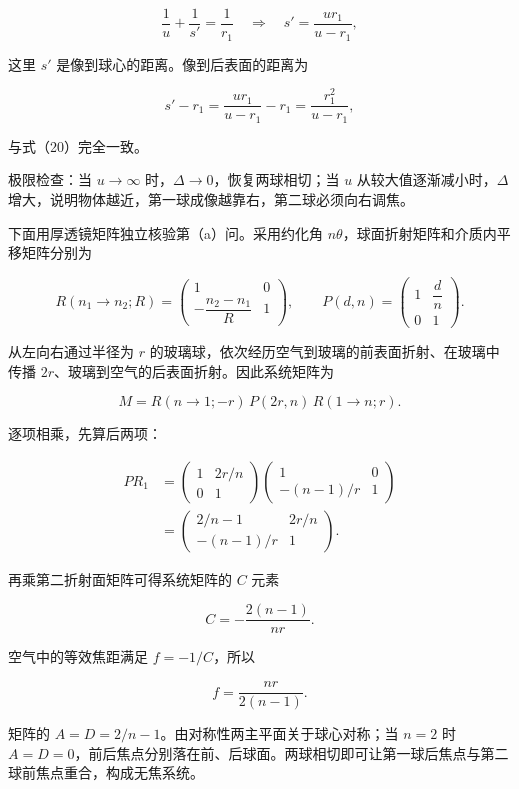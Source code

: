 \documentclass[12pt,a4paper,UTF8]{ctexart}
\begin{document}
\[
\frac1u+\frac1{s'}=\frac1{r_1}
\quad\Longrightarrow\quad
s'=\frac{ur_1}{u-r_1}, \tag{21}
\]

这里 \(s'\) 是像到球心的距离。像到后表面的距离为

\[
s'-r_1
=\frac{ur_1}{u-r_1}-r_1
=\frac{r_1^2}{u-r_1}, \tag{22}
\]

与式（20）完全一致。

极限检查：当 \(u\to\infty\) 时，\(\Delta\to0\)，恢复两球相切；当 \(u\)
从较大值逐渐减小时，\(\Delta\)
增大，说明物体越近，第一球成像越靠右，第二球必须向右调焦。

下面用厚透镜矩阵独立核验第（a）问。采用约化角
\(n\theta\)，球面折射矩阵和介质内平移矩阵分别为

\[
R(n_1\to n_2;R)=
\begin{pmatrix}
1&0\\
-\dfrac{n_2-n_1}{R}&1
\end{pmatrix},
\qquad
P(d,n)=
\begin{pmatrix}
1&\dfrac dn\\
0&1
\end{pmatrix}. \tag{23}
\]

从左向右通过半径为 \(r\)
的玻璃球，依次经历空气到玻璃的前表面折射、在玻璃中传播
\(2r\)、玻璃到空气的后表面折射。因此系统矩阵为

\[
M=R(n\to1;-r)\,P(2r,n)\,R(1\to n;r). \tag{24}
\]

逐项相乘，先算后两项：

\[
\begin{aligned}
P R_1
&=
\begin{pmatrix}
1&2r/n\\0&1
\end{pmatrix}
\begin{pmatrix}
1&0\\-(n-1)/r&1
\end{pmatrix}\\
&=
\begin{pmatrix}
2/n-1&2r/n\\
-(n-1)/r&1
\end{pmatrix}.
\end{aligned} \tag{25}
\]

再乘第二折射面矩阵可得系统矩阵的 \(C\) 元素

\[
C=-\frac{2(n-1)}{nr}. \tag{26}
\]

空气中的等效焦距满足 \(f=-1/C\)，所以

\[
f=\frac{nr}{2(n-1)}. \tag{27}
\]

矩阵的 \(A=D=2/n-1\)。由对称性两主平面关于球心对称；当 \(n=2\) 时
\(A=D=0\)，前后焦点分别落在前、后球面。两球相切即可让第一球后焦点与第二球前焦点重合，构成无焦系统。
\end{document}
